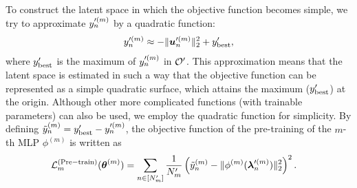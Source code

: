 To construct the latent space in which the objective function becomes simple, we try to approximate $y_n^{\prime (m)}$ by a quadratic function:
\begin{align}
 y_n^{\prime (m)} \approx - \| \boldsymbol{u}_n^{\prime (m)} \|_2^2 + y_{\rm best}^\prime,
 \label{eq:def_quad_approx}
\end{align}
where 
$y_{\rm best}^\prime$
is the maximum of 
$y_n^{\prime (m)}$
in 
${\mathcal O}^\prime$.
%
%
This approximation means that the latent space is estimated in such a way that the objective function can be represented as a simple quadratic surface, which attains the maximum ($y_{\rm best}^\prime$) at the origin.
%
Although other more complicated functions (with trainable parameters) can also be used, we employ the quadratic function for simplicity.
%
By defining 
$\tilde{y}_n^{(m)} = y_{\rm best}^\prime - y_n^{\prime (m)}$,
the objective function of the pre-training of the $m$-th MLP $\phi^{(m)}$ is written as
\begin{align}
 & {\mathcal L}_m^{\rm (Pre-train)}(\boldsymbol{\theta}^{(m)}) 
 = 
 \sum_{n \in [N^\prime_m]} 
 \frac{1}{N^\prime_m}
 \left( \tilde{y}_n^{(m)} - \| \phi^{(m)}( \boldsymbol{\lambda}_n^{\prime (m)} ) \|_2^2 \right)^2. 
 \label{eq:pre_train_loss1}
\end{align}
